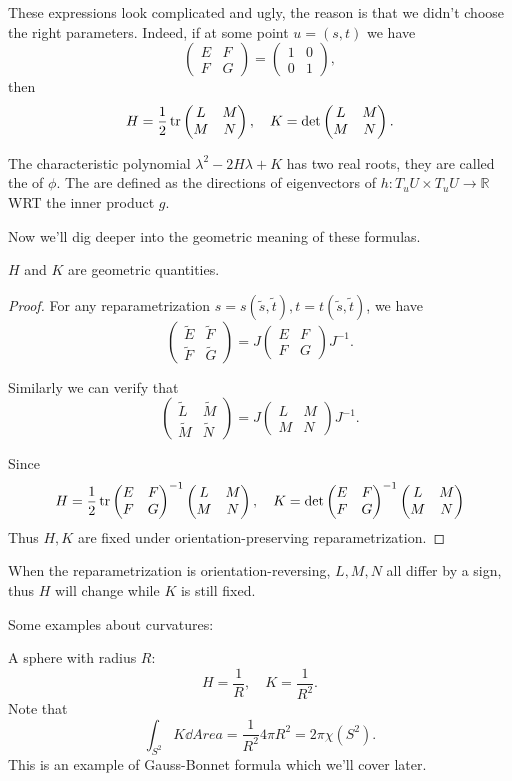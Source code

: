 These expressions look complicated and ugly, the reason is that we didn't
choose the right parameters. Indeed, if at some point $u=(s,t)$ we have
\[
\begin{pmatrix} E &F\\F&G \end{pmatrix} =
\begin{pmatrix} 1&0\\0&1 \end{pmatrix},
\]
then
\[
H = \frac{1}{2} \operatorname{tr} \begin{pmatrix} L&M\\M&N \end{pmatrix}, \quad
K = \det \begin{pmatrix} L&M\\M&N \end{pmatrix}.
\]

\begin{definition}
	The characteristic polynomial $\lambda^2 - 2H\lambda + K$
	has two real roots, they are called the
	 of $\phi$.
	The  are defined as
	the directions of eigenvectors of $h: T_uU\times T_uU\to \mathbb{R}$
	WRT the inner product $g$.
\end{definition}

Now we'll dig deeper into the geometric meaning of these formulas.
\begin{proposition}
	$H$ and $K$ are geometric quantities.
\end{proposition}
\begin{proof}[Proof]
    For any reparametrization $s=s(\tilde s, \tilde t), t=t(\tilde s,\tilde t)$,
	we have
	\[
		\begin{pmatrix}\tilde E&\tilde F\\ \tilde F&\tilde G \end{pmatrix}
		= J\begin{pmatrix} E&F\\F&G \end{pmatrix}J^{-1}.
	\]

	Similarly we can verify that
	\[
		\begin{pmatrix}\tilde L&\tilde M\\ \tilde M&\tilde N \end{pmatrix}
		= J\begin{pmatrix} L&M\\M&N \end{pmatrix}J^{-1}.
	\]

	Since
	\[
	H = \frac{1}{2}\operatorname{tr}\begin{pmatrix} E&F\\F&G \end{pmatrix}^{-1}\begin{pmatrix} L&M\\M&N \end{pmatrix},\quad
	K = \det \begin{pmatrix} E&F\\F&G \end{pmatrix}^{-1}\begin{pmatrix} L&M\\M&N \end{pmatrix}
	\]
	Thus $H,K$ are fixed under orientation-preserving reparametrization.
\end{proof}
\begin{remark}
    When the reparametrization is orientation-reversing, $L,M,N$ all
	differ by a sign, thus $H$ will change while $K$ is still fixed.
\end{remark}

Some examples about curvatures:
\begin{example}
	A sphere with radius $R$:
	\[
	H = \frac{1}{R}, \quad K = \frac{1}{R^2}.
	\]
	Note that
	\[
	\int _{S^2} K \dd Area = \frac{1}{R^2}4\pi R^2 = 2\pi \chi(S^2).
	\]
	This is an example of Gauss-Bonnet formula which we'll cover later.
\end{example}
